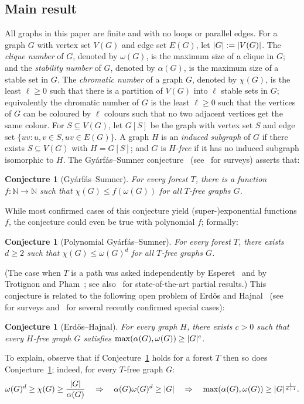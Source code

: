 \documentclass[11pt,reqno]{amsart}
\newtheorem{conjecture}[theorem]{Conjecture}
\newcommand{\mab}{\mathbb}
\renewcommand{\subset}{\subseteq}
\newcommand{\erh}{Erd\H{o}s--Hajnal}
\newcommand{\gas}{Gy\'{a}rf\'{a}s--Sumner}
\DeclarePairedDelimiter\abs{\lvert}{\rvert}%
\begin{document}
	\subsection{Main result}
	All graphs in this paper are finite and with no loops or parallel edges.
	For a graph $G$ with vertex set $V(G)$ and edge set $E(G)$, let $\abs G:=\abs{V(G)}$.
	The {\em clique number} of $G$, denoted by $\omega(G)$, is the maximum size of a clique in $G$;
	and the {\em stability number} of $G$, denoted by $\alpha(G)$, is the maximum size of a stable set in $G$. The {\em chromatic number} of a graph $G$, denoted by $\chi(G)$, is the least $\ell\ge0$ such that there is a partition of $V(G)$ into $\ell$ stable sets in $G$;
	equivalently the chromatic number of $G$ is the least $\ell\ge0$ such that the vertices of $G$ can be coloured by $\ell$ colours such that no two adjacent vertices get the same colour.
	For $S\subset V(G)$, let $G[S]$ be the graph with vertex set $S$ and edge set $\{uv:u,v\in S,uv\in E(G)\}$.
	A graph $H$ is an {\em induced subgraph} of $G$ if there exists $S\subset V(G)$ with $H=G[S]$;
	and $G$ is {\em $H$-free} if it has no induced subgraph isomorphic to $H$.
	The \gas{} conjecture~\cite{MR382051,MR634555} (see~\cite{scott2022,MR4174126} for surveys) asserts that:
	\begin{conjecture}
		[\gas]
		\label{conj:gs}
		For every forest $T$, there is a function $f\colon \mab N\to\mab N$ such that $\chi(G)\le f(\omega(G))$ for all $T$-free graphs $G$.
	\end{conjecture}
	While most confirmed cases of this conjecture yield (super-)exponential functions $f$, the conjecture could even be true with polynomial $f$; formally:
	\begin{conjecture}
		[Polynomial \gas]
		\label{conj:pgs}
		For every forest $T$, there exists $d\ge2$ such that $\chi(G)\le\omega(G)^d$ for all $T$-free graphs $G$.
	\end{conjecture}
	
	(The case when $T$ is a path was asked independently by Esperet~\cite{esperet} and by Trotignon and Pham~\cite{MR3789676}; see also~\cite{2024p5,MR4472775} for state-of-the-art partial results.)
	This conjecture is related to the following open problem of Erd\H os and Hajnal~\cite{MR599767,MR1031262} (see~\cite{MR1425208,MR3150572} for surveys and~\cite{density3,density4,density6,density7,MR4563865} for several recently confirmed special cases):
	\begin{conjecture}
		[\erh]
		\label{conj:eh}
		For every graph $H$, there exists $c>0$ such that every $H$-free graph $G$ satisfies $\max(\alpha(G),\omega(G))\ge\abs G^c$.
	\end{conjecture}
	To explain, observe that if Conjecture~\ref{conj:pgs} holds for a forest $T$ then so does Conjecture~\ref{conj:eh}; indeed, for every $T$-free graph $G$:
	\begin{equation*}
		\omega(G)^d\ge\chi(G)\ge \frac{\abs G}{\alpha(G)}
		\quad\Rightarrow\quad
		\alpha(G)\omega(G)^d\ge\abs G
		\quad\Rightarrow\quad
		\max(\alpha(G),\omega(G))\ge\abs G^{\frac1{d+1}}.
	\end{equation*}
	
\end{document}
